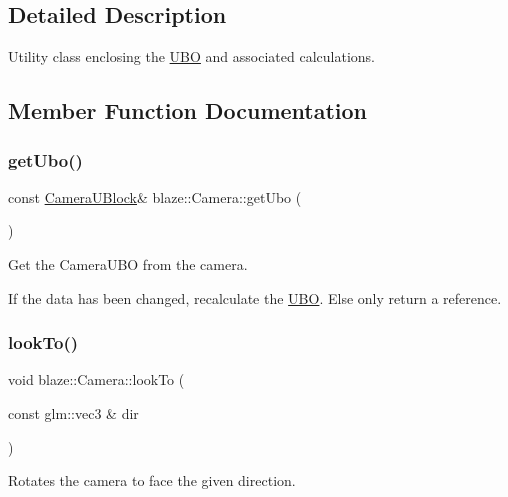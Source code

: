\subsection{Detailed Description}
Utility class enclosing the \hyperlink{classblaze_1_1UBO}{U\+BO} and associated calculations. 

\subsection{Member Function Documentation}
\mbox{\label{classblaze_1_1Camera_a1eb1a0c7d84b4c0dcb4fdf778d183414}} 
\subsubsection{\texorpdfstring{get\+Ubo()}{getUbo()}}
{\footnotesize\ttfamily const \hyperlink{structblaze_1_1CameraUBlock}{Camera\+U\+Block}\& blaze\+::\+Camera\+::get\+Ubo (\begin{DoxyParamCaption}{ }\end{DoxyParamCaption})\hspace{0.3cm}{\ttfamily [inline]}}



Get the Camera\+U\+BO from the camera. 

If the data has been changed, recalculate the \hyperlink{classblaze_1_1UBO}{U\+BO}. Else only return a reference. \mbox{\label{classblaze_1_1Camera_a5820403405615c8af6a7e7d198ea0e5d}} 
\subsubsection{\texorpdfstring{look\+To()}{lookTo()}}
{\footnotesize\ttfamily void blaze\+::\+Camera\+::look\+To (\begin{DoxyParamCaption}\item[{const glm\+::vec3 \&}]{dir }\end{DoxyParamCaption})\hspace{0.3cm}{\ttfamily [inline]}}



Rotates the camera to face the given direction. 


